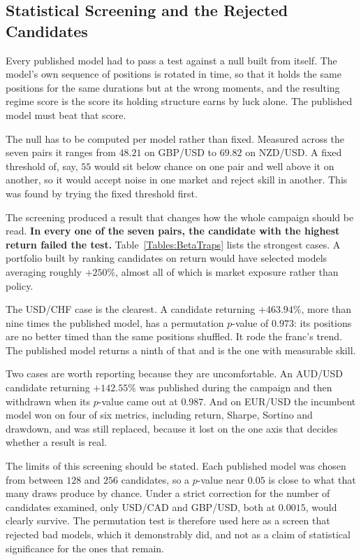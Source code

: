 \subsection{Statistical Screening and the Rejected Candidates}
\label{Subsection:StatisticalScreening}

Every published model had to pass a test against a null built from itself. The model's own sequence of positions is rotated in time, so that it holds the same positions for the same durations but at the wrong moments, and the resulting regime score is the score its holding structure earns by luck alone. The published model must beat that score.

The null has to be computed per model rather than fixed. Measured across the seven pairs it ranges from $48.21$ on GBP/USD to $69.82$ on NZD/USD. A fixed threshold of, say, $55$ would sit below chance on one pair and well above it on another, so it would accept noise in one market and reject skill in another. This was found by trying the fixed threshold first.

The screening produced a result that changes how the whole campaign should be read. \textbf{In every one of the seven pairs, the candidate with the highest return failed the test.} Table~\ref{Tables:BetaTraps} lists the strongest cases. A portfolio built by ranking candidates on return would have selected models averaging roughly $+250\%$, almost all of which is market exposure rather than policy.



The USD/CHF case is the clearest. A candidate returning $+463.94\%$, more than nine times the published model, has a permutation $p$-value of $0.973$: its positions are no better timed than the same positions shuffled. It rode the franc's trend. The published model returns a ninth of that and is the one with measurable skill.

Two cases are worth reporting because they are uncomfortable. An AUD/USD candidate returning $+142.55\%$ was published during the campaign and then withdrawn when its $p$-value came out at $0.987$. And on EUR/USD the incumbent model won on four of six metrics, including return, Sharpe, Sortino and drawdown, and was still replaced, because it lost on the one axis that decides whether a result is real.

The limits of this screening should be stated. Each published model was chosen from between $128$ and $256$ candidates, so a $p$-value near $0.05$ is close to what that many draws produce by chance. Under a strict correction for the number of candidates examined, only USD/CAD and GBP/USD, both at $0.0015$, would clearly survive. The permutation test is therefore used here as a screen that rejected bad models, which it demonstrably did, and not as a claim of statistical significance for the ones that remain.